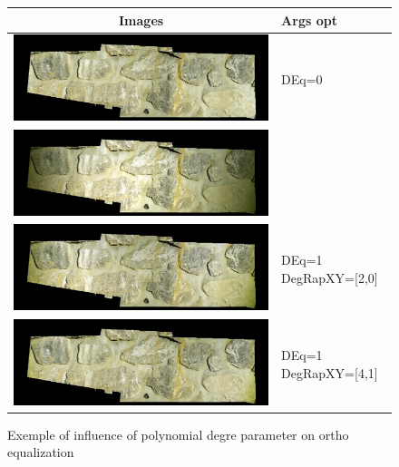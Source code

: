 \begin{figure}
\begin{tabular} { | c | p{2 cm} |  } \hline
 Images   &    Args opt  \\  \hline \hline
\includegraphics[width=150mm]{FIGS/MurSaintMartin/Ortho-Eg-Test-Redr-0-0.jpg}  &    DEq=0 \\  \hline
\includegraphics[width=150mm]{FIGS/MurSaintMartin/Ortho-Eg-Test-Redr-1-0.jpg}  &      \\  \hline
\includegraphics[width=150mm]{FIGS/MurSaintMartin/Ortho-Eg-Test-Redr-1-2.jpg}  &    DEq=1 DegRapXY=[2,0] \\  \hline
\includegraphics[width=150mm]{FIGS/MurSaintMartin/Ortho-Eg-Test-Redr-1-4_1.jpg}  &    DEq=1 DegRapXY=[4,1] \\  \hline
\end{tabular}
\caption{Exemple of influence of polynomial degre parameter on ortho equalization}
\label{Tab:Ortho:Polyn}
\end{figure}


